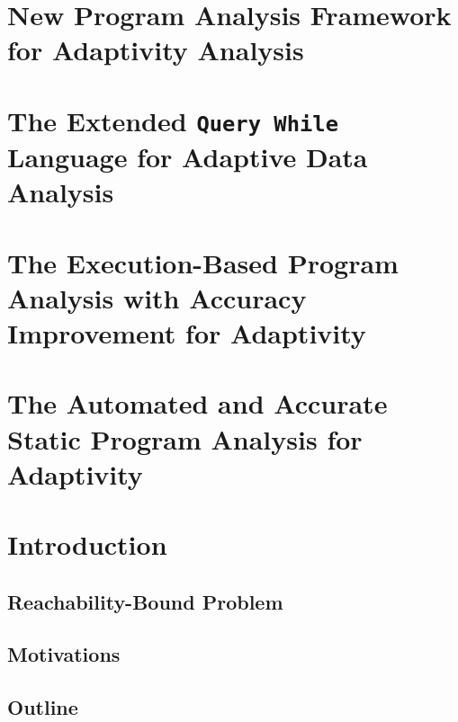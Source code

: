 \documentclass[a4paper,11pt]{article}
\begin{document}
\section{ New Program Analysis Framework for Adaptivity Analysis}
\label{sec:furthers}


\section{The Extended {\tt Query While} Language for Adaptive Data Analysis}
\label{sec:language}


\section{The Execution-Based Program Analysis with Accuracy Improvement for Adaptivity}
\label{sec:dynamic}


\section{The Automated and Accurate Static Program Analysis for Adaptivity}
\label{sec:static}





\section*{}
%

\section{Introduction}
\label{sec:reachability-intro}
\subsection{Reachability-Bound Problem}
\label{sec:reachability-background}

\subsection{Motivations}
\label{sec:reachability-motivation}

\subsection{Outline}
\label{sec:reachability-outline}
\end{document}
